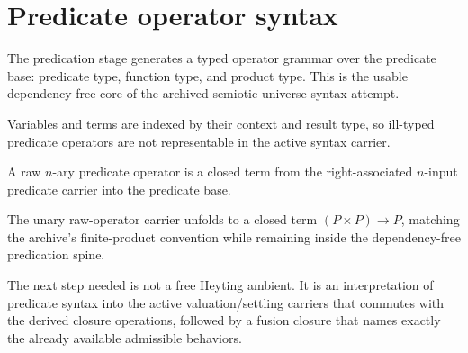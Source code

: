 \section{Predicate operator syntax}

\begin{proposition}\label{thm:predicate-syntax-types}\leanok{}
The predication stage generates a typed operator grammar over the predicate
base: predicate type, function type, and product type. This is the usable
dependency-free core of the archived semiotic-universe syntax attempt.
\end{proposition}

\begin{proposition}\label{thm:predicate-syntax-terms}\leanok{}
Variables and terms are indexed by their context and result type, so ill-typed
predicate operators are not representable in the active syntax carrier.
\end{proposition}

\begin{proposition}\label{thm:raw-predicate-operators}\leanok{}
A raw $n$-ary predicate operator is a closed term from the right-associated
$n$-input predicate carrier into the predicate base.
\end{proposition}

\begin{theorem}\label{thm:rawop-one-carrier}\leanok{}
The unary raw-operator carrier unfolds to a closed term
$(P \times P)\to P$, matching the archive's finite-product convention while
remaining inside the dependency-free predication spine.
\end{theorem}

\begin{theorem}\label{thm:predicate-syntax-interpretation-frontier}\notready{}
The next step needed is not a free Heyting ambient. It is an interpretation of
predicate syntax into the active valuation/settling carriers that commutes
with the derived closure operations, followed by a fusion closure that names
exactly the already available admissible behaviors.
\end{theorem}
